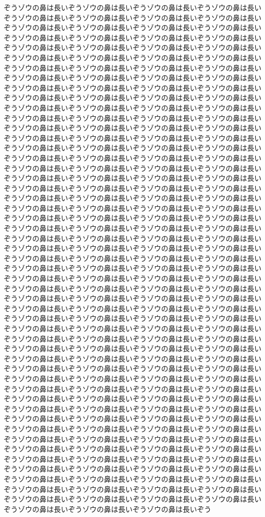 ぞうゾウの鼻は長いぞうゾウの鼻は長いぞうゾウの鼻は長いぞうゾウの鼻は長いぞうゾウの鼻は長いぞうゾウの鼻は長いぞうゾウの鼻は長いぞうゾウの鼻は長いぞうゾウの鼻は長いぞうゾウの鼻は長いぞうゾウの鼻は長いぞうゾウの鼻は長いぞうゾウの鼻は長いぞうゾウの鼻は長いぞうゾウの鼻は長いぞうゾウの鼻は長いぞうゾウの鼻は長いぞうゾウの鼻は長いぞうゾウの鼻は長いぞうゾウの鼻は長いぞうゾウの鼻は長いぞうゾウの鼻は長いぞうゾウの鼻は長いぞうゾウの鼻は長いぞうゾウの鼻は長いぞうゾウの鼻は長いぞうゾウの鼻は長いぞうゾウの鼻は長いぞうゾウの鼻は長いぞうゾウの鼻は長いぞうゾウの鼻は長いぞうゾウの鼻は長いぞうゾウの鼻は長いぞうゾウの鼻は長いぞうゾウの鼻は長いぞうゾウの鼻は長いぞうゾウの鼻は長いぞうゾウの鼻は長いぞうゾウの鼻は長いぞうゾウの鼻は長いぞうゾウの鼻は長いぞうゾウの鼻は長いぞうゾウの鼻は長いぞうゾウの鼻は長いぞうゾウの鼻は長いぞうゾウの鼻は長いぞうゾウの鼻は長いぞうゾウの鼻は長いぞうゾウの鼻は長いぞうゾウの鼻は長いぞうゾウの鼻は長いぞうゾウの鼻は長いぞうゾウの鼻は長いぞうゾウの鼻は長いぞうゾウの鼻は長いぞうゾウの鼻は長いぞうゾウの鼻は長いぞうゾウの鼻は長いぞうゾウの鼻は長いぞうゾウの鼻は長いぞうゾウの鼻は長いぞうゾウの鼻は長いぞうゾウの鼻は長いぞうゾウの鼻は長いぞうゾウの鼻は長いぞうゾウの鼻は長いぞうゾウの鼻は長いぞうゾウの鼻は長いぞうゾウの鼻は長いぞうゾウの鼻は長いぞうゾウの鼻は長いぞうゾウの鼻は長いぞうゾウの鼻は長いぞうゾウの鼻は長いぞうゾウの鼻は長いぞうゾウの鼻は長いぞうゾウの鼻は長いぞうゾウの鼻は長いぞうゾウの鼻は長いぞうゾウの鼻は長いぞうゾウの鼻は長いぞうゾウの鼻は長いぞうゾウの鼻は長いぞうゾウの鼻は長いぞうゾウの鼻は長いぞうゾウの鼻は長いぞうゾウの鼻は長いぞうゾウの鼻は長いぞうゾウの鼻は長いぞうゾウの鼻は長いぞうゾウの鼻は長いぞうゾウの鼻は長いぞうゾウの鼻は長いぞうゾウの鼻は長いぞうゾウの鼻は長いぞうゾウの鼻は長いぞうゾウの鼻は長いぞうゾウの鼻は長いぞうゾウの鼻は長いぞうゾウの鼻は長いぞうゾウの鼻は長いぞうゾウの鼻は長いぞうゾウの鼻は長いぞうゾウの鼻は長いぞうゾウの鼻は長いぞうゾウの鼻は長いぞうゾウの鼻は長いぞうゾウの鼻は長いぞうゾウの鼻は長いぞうゾウの鼻は長いぞうゾウの鼻は長いぞうゾウの鼻は長いぞうゾウの鼻は長いぞうゾウの鼻は長いぞうゾウの鼻は長いぞうゾウの鼻は長いぞうゾウの鼻は長いぞうゾウの鼻は長いぞうゾウの鼻は長いぞうゾウの鼻は長いぞうゾウの鼻は長いぞうゾウの鼻は長いぞうゾウの鼻は長いぞうゾウの鼻は長いぞうゾウの鼻は長いぞうゾウの鼻は長いぞうゾウの鼻は長いぞうゾウの鼻は長いぞうゾウの鼻は長いぞうゾウの鼻は長いぞうゾウの鼻は長いぞうゾウの鼻は長いぞうゾウの鼻は長いぞうゾウの鼻は長いぞうゾウの鼻は長いぞうゾウの鼻は長いぞうゾウの鼻は長いぞうゾウの鼻は長いぞうゾウの鼻は長いぞうゾウの鼻は長いぞうゾウの鼻は長いぞうゾウの鼻は長いぞうゾウの鼻は長いぞうゾウの鼻は長いぞうゾウの鼻は長いぞうゾウの鼻は長いぞうゾウの鼻は長いぞうゾウの鼻は長いぞうゾウの鼻は長いぞうゾウの鼻は長いぞうゾウの鼻は長いぞうゾウの鼻は長いぞうゾウの鼻は長いぞうゾウの鼻は長いぞうゾウの鼻は長いぞうゾウの鼻は長いぞうゾウの鼻は長いぞうゾウの鼻は長いぞうゾウの鼻は長いぞうゾウの鼻は長いぞうゾウの鼻は長いぞうゾウの鼻は長いぞうゾウの鼻は長いぞうゾウの鼻は長いぞうゾウの鼻は長いぞうゾウの鼻は長いぞうゾウの鼻は長いぞうゾウの鼻は長いぞうゾウの鼻は長いぞうゾウの鼻は長いぞうゾウの鼻は長いぞうゾウの鼻は長いぞうゾウの鼻は長いぞうゾウの鼻は長いぞうゾウの鼻は長いぞうゾウの鼻は長いぞうゾウの鼻は長いぞうゾウの鼻は長いぞうゾウの鼻は長いぞうゾウの鼻は長いぞうゾウの鼻は長いぞうゾウの鼻は長いぞうゾウの鼻は長いぞうゾウの鼻は長いぞうゾウの鼻は長いぞうゾウの鼻は長いぞうゾウの鼻は長いぞうゾウの鼻は長いぞうゾウの鼻は長いぞうゾウの鼻は長いぞうゾウの鼻は長いぞうゾウの鼻は長いぞうゾウの鼻は長いぞうゾウの鼻は長いぞうゾウの鼻は長いぞうゾウの鼻は長いぞうゾウの鼻は長いぞうゾウの鼻は長いぞうゾウの鼻は長いぞうゾウの鼻は長いぞうゾウの鼻は長いぞうゾウの鼻は長いぞうゾウの鼻は長いぞう
